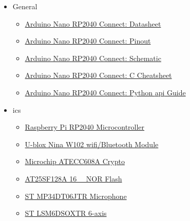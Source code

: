 \begin{frame}
    \begin{itemize}
        \item General
              \begin{itemize}
                  \item \href{https://content.arduino.cc/assets/ABX00053-datasheet.pdf}{Arduino\textregistered{} Nano RP2040 Connect: Datasheet}
                  \item \href{https://content.arduino.cc/assets/Pinout\_NanoRP2040\_latest\%20\%281\%29.png}{Arduino\textregistered{} Nano RP2040 Connect: Pinout}
                  \item \href{https://content.arduino.cc/assets/ABX00053-schematics.pdf}{Arduino\textregistered{} Nano RP2040 Connect: Schematic}
                  \item \href{https://docs.arduino.cc/tutorials/nano-rp2040-connect/rp2040-01-technical-reference}{Arduino\textregistered{} Nano RP2040 Connect: C Cheatsheet}
                  \item \href{https://docs.arduino.cc/tutorials/nano-rp2040-connect/rp2040-python-api}{Arduino\textregistered{} Nano RP2040 Connect: Python\textregistered{} \acs{api} Guide}
              \end{itemize}
        \item \acsp{ic}
              \begin{itemize}
                  \item \href{https://datasheets.raspberrypi.com/rp2040/rp2040-datasheet.pdf}{Raspberry Pi RP2040 Microcontroller}
                  \item \href{https://content.u-blox.com/sites/default/files/NINA-W10\_DataSheet\_UBX-17065507.pdf}{U-blox\textregistered{} Nina W102 \acs{wifi}/Bluetooth Module}
                  \item \href{https://ww1.microchip.com/downloads/en/DeviceDoc/40001977A.pdf}{Microchip\textregistered{} ATECC608A Crypto}
                  \item \href{https://www.renesas.com/in/en/document/dst/at25sf128a-datasheet?r=1608781}{AT25SF128A \SI{16}{\mebi\byte} NOR Flash}
                  \item \href{https://www.st.com/resource/en/datasheet/mp34dt06j.pdf}{ST MP34DT06JTR  Microphone}
                  \item \href{https://www.st.com/resource/en/datasheet/lsm6dsox.pdf}{ST LSM6DSOXTR 6-axis }

\end{itemize}
\end{itemize}
\end{frame}
